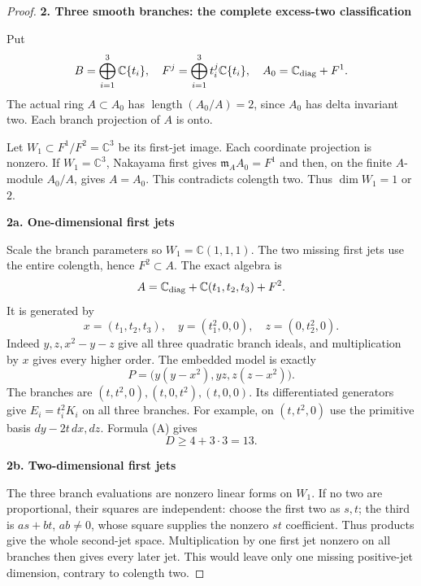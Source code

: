 \begin{proof}
\par\medskip\noindent\textbf{2. Three smooth branches: the complete excess-two classification}\par\label{three-smooth-branches-the-complete-excess-two-classification}

Put \[
 B=\bigoplus_{i=1}^3\mathbb C\{t_i\},\quad
 F^j=\bigoplus_{i=1}^3t_i^j\mathbb C\{t_i\},\quad
 A_0=\mathbb C_{\rm diag}+F^1.
\] The actual ring \(A\subset A_0\) has \(\operatorname{length}(A_0/A)=2\), since \(A_0\) has delta invariant two. Each branch projection of \(A\) is onto.

Let \(W_1\subset F^1/F^2=\mathbb C^3\) be its first-jet image. Each coordinate projection is nonzero. If \(W_1=\mathbb C^3\), Nakayama first gives \(\mathfrak m_AA_0=F^1\) and then, on the finite \(A\)-module \(A_0/A\), gives \(A=A_0\). This contradicts colength two. Thus \(\dim W_1=1\) or \(2\).

\par\medskip\noindent\textbf{2a. One-dimensional first jets}\par\label{a.-one-dimensional-first-jets}

Scale the branch parameters so \(W_1=\mathbb C(1,1,1)\). The two missing first jets use the entire colength, hence \(F^2\subset A\). The exact algebra is \[
 A=\mathbb C_{\rm diag}+\mathbb C(t_1,t_2,t_3)+F^2.
\] It is generated by \[
 x=(t_1,t_2,t_3),\quad y=(t_1^2,0,0),\quad z=(0,t_2^2,0).
\] Indeed \(y,z,x^2-y-z\) give all three quadratic branch ideals, and multiplication by \(x\) gives every higher order. The embedded model is exactly \[
       P=\bigl(y(y-x^2),yz,z(z-x^2)\bigr).             \tag{C}
\] The branches are \((t,t^2,0),(t,0,t^2),(t,0,0)\). Its differentiated generators give \(E_i=t_i^2K_i\) on all three branches. For example, on \((t,t^2,0)\) use the primitive basis \(dy-2t\,dx,dz\). Formula (A) gives \[
                         D\ge4+3\cdot3=13.            \tag{D}
\]

\par\medskip\noindent\textbf{2b. Two-dimensional first jets}\par\label{b.-two-dimensional-first-jets}

The three branch evaluations are nonzero linear forms on \(W_1\). If no two are proportional, their squares are independent: choose the first two as \(s,t\); the third is \(as+bt\), \(ab\ne0\), whose square supplies the nonzero \(st\) coefficient. Thus products give the whole second-jet space. Multiplication by one first jet nonzero on all branches then gives every later jet. This would leave only one missing positive-jet dimension, contrary to colength two.


\end{proof}
